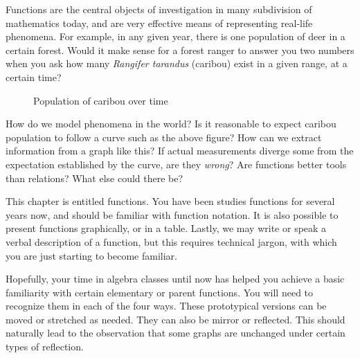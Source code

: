 


Functions are the central objects of investigation in many subdivision of mathematics today, and
are very effective means of representing real-life phenomena. For example, in any given year, 
there is one population of
deer in a certain forest.  Would it make sense for a forest ranger to answer you two numbers when
you ask how many \textit{Rangifer tarandus} (caribou) exist in a given range, at a certain time?


\begin{figure}[h]
\centering
{}
\caption{Population of caribou over time}
\end{figure}

How do we model phenomena in the world?  Is it reasonable to expect
caribou population to follow a curve such as the above figure?  How can we 
extract information from a graph like this?  If actual measurements diverge some
from the expectation established by the curve, are they \emph{wrong}?  Are functions
better tools than relations?  What else could there be?

\newpage
\chapterminitoc

This chapter is entitled functions.  You have been studies functions for several years now,
and should be familiar with function notation.  It is also possible to present functions 
graphically, or in a table.  Lastly, we may write or speak a verbal description of a function,
but this requires technical jargon, with which you are just starting to become familiar.

Hopefully, your time in algebra classes until now has helped you achieve a basic familiarity
with certain elementary or parent functions.  You will need to recognize them in each
of the four ways.  These prototypical versions can be moved or stretched as needed.  They
can also be mirror or reflected.  This should naturally lead to the observation that some
graphs are unchanged under certain types of reflection.

